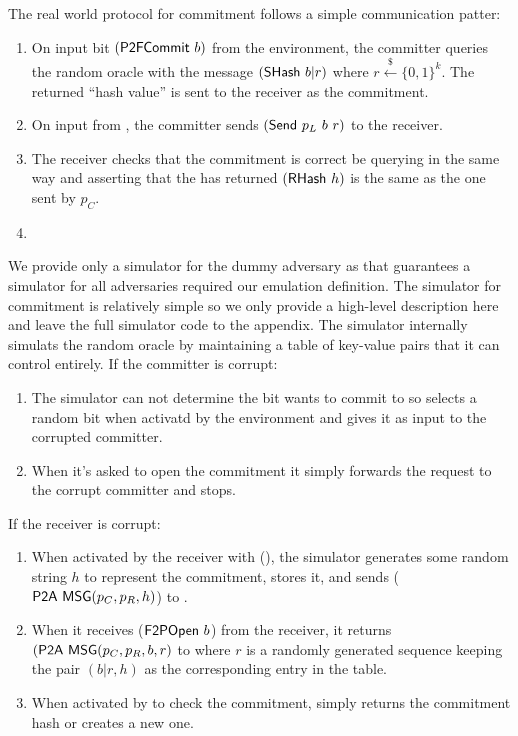 The real world protocol for commitment follows a simple communication patter:
\begin{enumerate}
\item On input bit $(\msf{P2FCommit}\ b)$ from the environment, the committer queries the random oracle with the message $({\mathsf {SHash}}\ b | r)$ where $r \xleftarrow{\$} \{0,1\}^k$.
The returned ``hash value'' is sent to the receiver as the commitment.
\item On input  from \Environment, the committer sends $({\mathsf {Send}}\ p_L\ b\ r)$ to the receiver.
\item The receiver checks that the commitment is correct be querying \Fro in the same way and asserting that the has returned $({\mathsf {RHash}}\ h)$ is the same as the one sent by $p_C$.
\item {}
\end{enumerate}

We provide only a simulator for the dummy adversary as that guarantees a simulator for all adversaries required our emulation definition.
The simulator for commitment is relatively simple so we only provide a high-level description here and leave the full simulator code to the appendix.
The simulator internally simulats the random oracle by maintaining a table of key-value pairs that it can control entirely.
If the committer is corrupt:
\begin{enumerate}
\item The simulator can not determine the bit \Environment wants to commit to so selects a random bit when activatd by the environment and gives it as input to the corrupted committer.
\item When it's asked to open the commitment it simply forwards the request to the corrupt committer and stops.
\end{enumerate}
If the receiver is corrupt:
\begin{enumerate}
\item When activated by the receiver with (), the simulator generates some random string $h$ to represent the commitment, stores it, and sends (${\mathsf {P2A}}\ {\mathsf {MSG}}(p_C, p_R, h)$) to \Environment.
\item When it receives ($\msf{F2POpen}\ b$) from the receiver, it returns $({\mathsf {P2A}}\ {\mathsf {MSG}}(p_C, p_R, b, r)$ to \Environment where $r$ is a randomly generated sequence keeping the pair $(b | r, h)$ as the corresponding entry in the table.
\item When activated by \Environment to check the commitment, \Simulator simply returns the commitment hash or creates a new one.
\end{enumerate}

